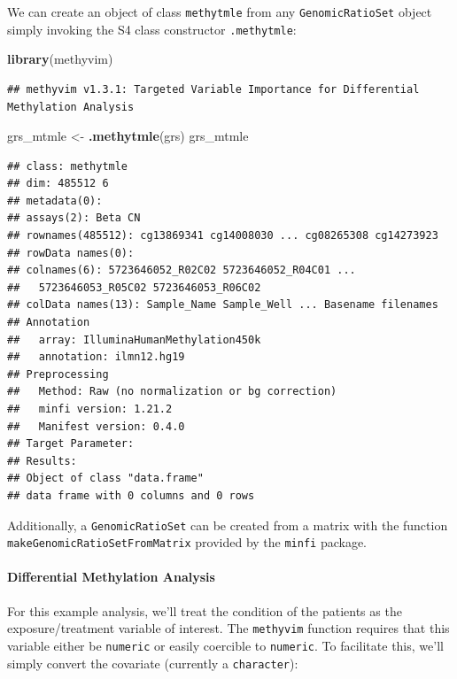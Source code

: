 \documentclass[9pt,a4paper,]{extarticle}
\newenvironment{Shaded}{\begin{snugshade}}{\end{snugshade}}
\newcommand{\KeywordTok}[1]{\textcolor[rgb]{0.13,0.29,0.53}{\textbf{#1}}}
\newcommand{\NormalTok}[1]{#1}
\newcommand{\StringTok}[1]{\textcolor[rgb]{0.31,0.60,0.02}{#1}}
\theoremstyle{definition}
\theoremstyle{definition}
\theoremstyle{definition}
\theoremstyle{remark}
\begin{document}
We can create an object of class \texttt{methytmle} from any \texttt{GenomicRatioSet} object
simply invoking the S4 class constructor \texttt{.methytmle}:

\begin{Shaded}
\begin{Highlighting}[]
\KeywordTok{library}\NormalTok{(methyvim)}
\end{Highlighting}
\end{Shaded}

\begin{verbatim}
## methyvim v1.3.1: Targeted Variable Importance for Differential Methylation Analysis
\end{verbatim}

\begin{Shaded}
\begin{Highlighting}[]
\NormalTok{grs_mtmle <-}\StringTok{ }\KeywordTok{.methytmle}\NormalTok{(grs)}
\NormalTok{grs_mtmle}
\end{Highlighting}
\end{Shaded}

\begin{verbatim}
## class: methytmle 
## dim: 485512 6 
## metadata(0):
## assays(2): Beta CN
## rownames(485512): cg13869341 cg14008030 ... cg08265308 cg14273923
## rowData names(0):
## colnames(6): 5723646052_R02C02 5723646052_R04C01 ...
##   5723646053_R05C02 5723646053_R06C02
## colData names(13): Sample_Name Sample_Well ... Basename filenames
## Annotation
##   array: IlluminaHumanMethylation450k
##   annotation: ilmn12.hg19
## Preprocessing
##   Method: Raw (no normalization or bg correction)
##   minfi version: 1.21.2
##   Manifest version: 0.4.0
## Target Parameter: 
## Results: 
## Object of class "data.frame"
## data frame with 0 columns and 0 rows
\end{verbatim}

Additionally, a \texttt{GenomicRatioSet} can be created from a matrix with the
function \texttt{makeGenomicRatioSetFromMatrix} provided by the \texttt{minfi} package.

\hypertarget{differential-methylation-analysis}{%
\paragraph{Differential Methylation Analysis}\label{differential-methylation-analysis}}

For this example analysis, we'll treat the condition of the patients as the
exposure/treatment variable of interest. The \texttt{methyvim} function requires that
this variable either be \texttt{numeric} or easily coercible to \texttt{numeric}. To
facilitate this, we'll simply convert the covariate (currently a \texttt{character}):
\end{document}
